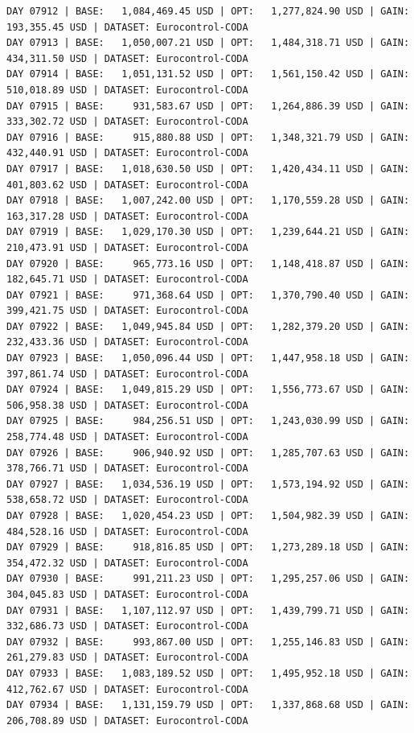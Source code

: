 \documentclass[11pt,a4paper]{article}
\begin{document}
\begin{verbatim}
DAY 07912 | BASE:   1,084,469.45 USD | OPT:   1,277,824.90 USD | GAIN: 193,355.45 USD | DATASET: Eurocontrol-CODA
DAY 07913 | BASE:   1,050,007.21 USD | OPT:   1,484,318.71 USD | GAIN: 434,311.50 USD | DATASET: Eurocontrol-CODA
DAY 07914 | BASE:   1,051,131.52 USD | OPT:   1,561,150.42 USD | GAIN: 510,018.89 USD | DATASET: Eurocontrol-CODA
DAY 07915 | BASE:     931,583.67 USD | OPT:   1,264,886.39 USD | GAIN: 333,302.72 USD | DATASET: Eurocontrol-CODA
DAY 07916 | BASE:     915,880.88 USD | OPT:   1,348,321.79 USD | GAIN: 432,440.91 USD | DATASET: Eurocontrol-CODA
DAY 07917 | BASE:   1,018,630.50 USD | OPT:   1,420,434.11 USD | GAIN: 401,803.62 USD | DATASET: Eurocontrol-CODA
DAY 07918 | BASE:   1,007,242.00 USD | OPT:   1,170,559.28 USD | GAIN: 163,317.28 USD | DATASET: Eurocontrol-CODA
DAY 07919 | BASE:   1,029,170.30 USD | OPT:   1,239,644.21 USD | GAIN: 210,473.91 USD | DATASET: Eurocontrol-CODA
DAY 07920 | BASE:     965,773.16 USD | OPT:   1,148,418.87 USD | GAIN: 182,645.71 USD | DATASET: Eurocontrol-CODA
DAY 07921 | BASE:     971,368.64 USD | OPT:   1,370,790.40 USD | GAIN: 399,421.75 USD | DATASET: Eurocontrol-CODA
DAY 07922 | BASE:   1,049,945.84 USD | OPT:   1,282,379.20 USD | GAIN: 232,433.36 USD | DATASET: Eurocontrol-CODA
DAY 07923 | BASE:   1,050,096.44 USD | OPT:   1,447,958.18 USD | GAIN: 397,861.74 USD | DATASET: Eurocontrol-CODA
DAY 07924 | BASE:   1,049,815.29 USD | OPT:   1,556,773.67 USD | GAIN: 506,958.38 USD | DATASET: Eurocontrol-CODA
DAY 07925 | BASE:     984,256.51 USD | OPT:   1,243,030.99 USD | GAIN: 258,774.48 USD | DATASET: Eurocontrol-CODA
DAY 07926 | BASE:     906,940.92 USD | OPT:   1,285,707.63 USD | GAIN: 378,766.71 USD | DATASET: Eurocontrol-CODA
DAY 07927 | BASE:   1,034,536.19 USD | OPT:   1,573,194.92 USD | GAIN: 538,658.72 USD | DATASET: Eurocontrol-CODA
DAY 07928 | BASE:   1,020,454.23 USD | OPT:   1,504,982.39 USD | GAIN: 484,528.16 USD | DATASET: Eurocontrol-CODA
DAY 07929 | BASE:     918,816.85 USD | OPT:   1,273,289.18 USD | GAIN: 354,472.32 USD | DATASET: Eurocontrol-CODA
DAY 07930 | BASE:     991,211.23 USD | OPT:   1,295,257.06 USD | GAIN: 304,045.83 USD | DATASET: Eurocontrol-CODA
DAY 07931 | BASE:   1,107,112.97 USD | OPT:   1,439,799.71 USD | GAIN: 332,686.73 USD | DATASET: Eurocontrol-CODA
DAY 07932 | BASE:     993,867.00 USD | OPT:   1,255,146.83 USD | GAIN: 261,279.83 USD | DATASET: Eurocontrol-CODA
DAY 07933 | BASE:   1,083,189.52 USD | OPT:   1,495,952.18 USD | GAIN: 412,762.67 USD | DATASET: Eurocontrol-CODA
DAY 07934 | BASE:   1,131,159.79 USD | OPT:   1,337,868.68 USD | GAIN: 206,708.89 USD | DATASET: Eurocontrol-CODA

\end{verbatim}
\end{document}
